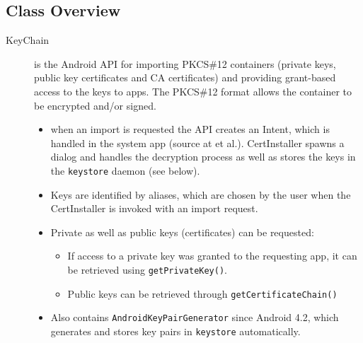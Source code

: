 \documentclass[a4paper,draft]{scrartcl}
\begin{document}
	\subsection{Class Overview}
		\begin{description}
			\item[KeyChain] is the Android API for importing PKCS\#12 containers (private keys, public key certificates and CA certificates) and providing grant-based access to the keys to apps. The PKCS\#12 format allows the container to be encrypted and/or signed.
				\begin{itemize}
					\item when an import is requested the API creates an Intent, which is handled in the system app  (source at  et al.). CertInstaller spawns a dialog and handles the decryption process as well as stores the keys in the \texttt{keystore} daemon (see below).
					\item Keys are identified by aliases, which are chosen by the user when the CertInstaller is invoked with an import request.
					\item Private as well as public keys (certificates) can be requested:
					\begin{itemize}
						\item If access to a private key was granted to the requesting app, it can be retrieved using \texttt{getPrivateKey()}.
						\item Public keys can be retrieved through \texttt{getCertificateChain()}
					\end{itemize}
				\item Also contains \texttt{AndroidKeyPairGenerator} since Android 4.2, which generates and stores key pairs in \texttt{key\-store} automatically.
				\end{itemize}


\end{description}
\end{document}
